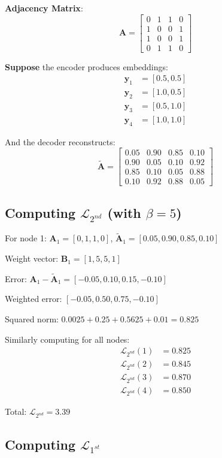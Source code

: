 \begin{notechapter}
\begin{example}
\textbf{Adjacency Matrix}:
\[
\bm{A} = \begin{bmatrix}
0 & 1 & 1 & 0 \\
1 & 0 & 0 & 1 \\
1 & 0 & 0 & 1 \\
0 & 1 & 1 & 0
\end{bmatrix}
\]

\textbf{Suppose} the encoder produces embeddings:
\begin{align*}
\bm{y}_1 &= [0.5, 0.5] \\
\bm{y}_2 &= [1.0, 0.5] \\
\bm{y}_3 &= [0.5, 1.0] \\
\bm{y}_4 &= [1.0, 1.0]
\end{align*}

And the decoder reconstructs:
\[
\tilde{\bm{A}} = \begin{bmatrix}
0.05 & 0.90 & 0.85 & 0.10 \\
0.90 & 0.05 & 0.10 & 0.92 \\
0.85 & 0.10 & 0.05 & 0.88 \\
0.10 & 0.92 & 0.88 & 0.05
\end{bmatrix}
\]

\subsection*{Computing $\mathcal{L}_{2^{nd}}$ (with $\beta = 5$)}

For node 1: $\bm{A}_1 = [0, 1, 1, 0]$, $\tilde{\bm{A}}_1 = [0.05, 0.90, 0.85, 0.10]$

Weight vector: $\bm{B}_1 = [1, 5, 5, 1]$

Error: $\bm{A}_1 - \tilde{\bm{A}}_1 = [-0.05, 0.10, 0.15, -0.10]$

Weighted error: $[-0.05, 0.50, 0.75, -0.10]$

Squared norm: $0.0025 + 0.25 + 0.5625 + 0.01 = 0.825$

Similarly computing for all nodes:
\begin{align*}
\mathcal{L}_{2^{nd}}(1) &= 0.825 \\
\mathcal{L}_{2^{nd}}(2) &= 0.845 \\
\mathcal{L}_{2^{nd}}(3) &= 0.870 \\
\mathcal{L}_{2^{nd}}(4) &= 0.850
\end{align*}

Total: $\mathcal{L}_{2^{nd}} = 3.39$

\subsection*{Computing $\mathcal{L}_{1^{st}}$}


\end{example}
\end{notechapter}
